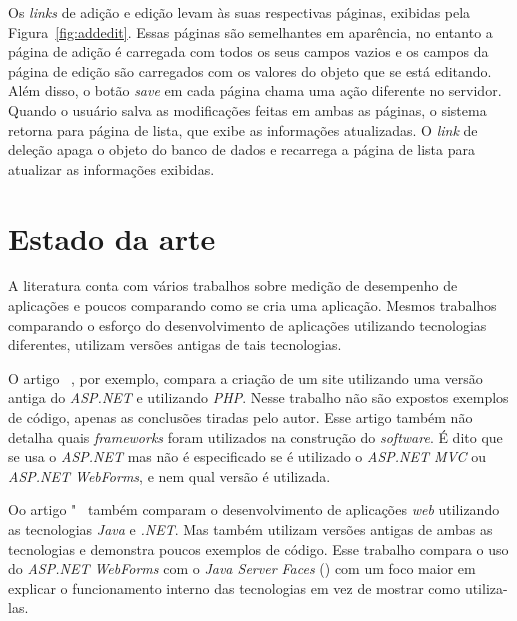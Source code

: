 
Os \textit{links} de adição e edição levam às suas respectivas páginas, exibidas pela Figura~\ref{fig:addedit}. 
Essas páginas são semelhantes em aparência, no entanto a página de adição é carregada com todos os seus campos vazios e os campos da página de edição são carregados com os valores do objeto que se está editando. 
Além disso, o botão \textit{save} em cada página chama uma ação diferente no servidor.
Quando o usuário salva as modificações feitas em ambas as páginas, o sistema retorna para página de lista, que exibe as informações atualizadas.
O \textit{link} de deleção apaga o objeto do banco de dados e recarrega a página de lista para atualizar as informações exibidas.


\section{Estado da arte}
\label{sec:estadoarte}
 
A literatura conta com vários trabalhos sobre medição de desempenho de aplicações  e poucos comparando como se cria uma aplicação. 
Mesmos trabalhos comparando o esforço do desenvolvimento de aplicações utilizando tecnologias diferentes, utilizam versões antigas de tais tecnologias. 

O artigo ~\cite{14}, por exemplo, compara a criação de um site utilizando uma versão antiga do \textit{ASP.NET} e utilizando \textit{PHP}. 
Nesse trabalho não são expostos exemplos de código, apenas as conclusões tiradas pelo autor. 
Esse artigo também não detalha quais \textit{frameworks} foram utilizados na construção do \textit{software}. 
É dito que se usa o \textit{ASP.NET} mas não é especificado se é utilizado o \textit{ASP.NET MVC} ou \textit{ASP.NET WebForms}, e nem qual versão é utilizada. 

Oo artigo "~\cite{15} também comparam o desenvolvimento de aplicações \textit{web} utilizando as tecnologias \textit{Java} e \textit{.NET}. 
Mas também utilizam versões antigas de ambas as tecnologias e demonstra poucos exemplos de código. Esse trabalho compara o uso do \textit{ASP.NET WebForms} com o \textit{Java Server Faces} () 
com um foco maior em explicar o funcionamento interno das tecnologias em vez de mostrar como utiliza-las.

